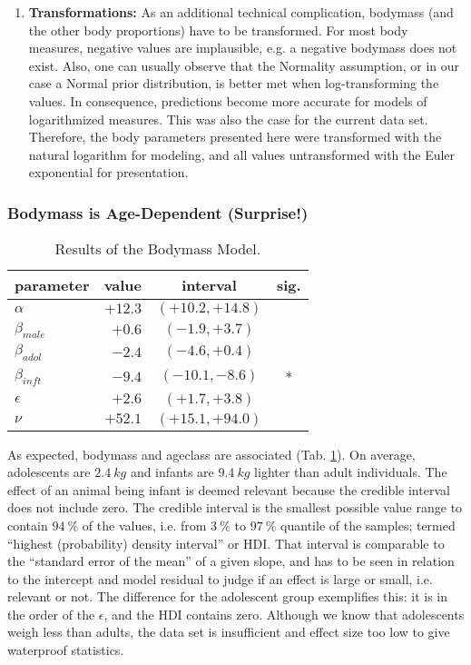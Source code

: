 \begin{enumerate}
\item \textbf{Transformations:}
\label{sec:org1dc49e0}
As an additional technical complication, bodymass (and the other body proportions) have to be transformed.
For most body measures, negative values are implausible, e.g. a negative bodymass does not exist.
Also, one can usually observe that the Normality assumption, or in our case a Normal prior distribution, is better met when log-transforming the values.
In consequence, predictions become more accurate for models of logarithmized measures.
This was also the case for the current data set.
Therefore, the body parameters presented here were transformed with the natural logarithm for modeling, and all values untransformed with the Euler exponential for presentation.
\end{enumerate}


\FloatBarrier
\subsubsection{Bodymass is Age-Dependent (Surprise!)}
\label{bodymass:results}
\begin{table}[p]
\caption{\label{tab:bodyproportions}Results of the Bodymass Model.}
\centering
\begin{tabular}{|l|r|c|c|}
\hline
\textbf{parameter} & \textbf{value} & \textbf{interval} & \textbf{sig.}\\[0pt]
\hline
\(\alpha\) & \(+12.3\) & \(\left(+10.2, +14.8\right)\) & \\[0pt]
\(\beta_{male}\) & \(+0.6\) & \(\left(-1.9, +3.7\right)\) & \\[0pt]
\(\beta_{adol}\) & \(-2.4\) & \(\left(-4.6, +0.4\right)\) & \\[0pt]
\(\beta_{inft}\) & \(-9.4\) & \(\left(-10.1, -8.6\right)\) & *\\[0pt]
\(\epsilon\) & \(+2.6\) & \(\left(+1.7, +3.8\right)\) & \\[0pt]
\(\nu\) & \(+52.1\) & \(\left(+15.1, +94.0\right)\) & \\[0pt]
\hline
\end{tabular}
\end{table}


As expected, bodymass and ageclass are associated (Tab. \ref{tab:bodyproportions}).
On average, adolescents are \(2.4\ kg\) and infants are \(9.4\ kg\) lighter than adult individuals.
The effect of an animal being infant is deemed relevant because the credible interval does not include zero.
The credible interval is the smallest possible value range to contain \(94\ \%\) of the values, i.e. from \(3\ \%\) to \(97\ \%\) quantile of the samples; termed ``highest (probability) density interval'' or HDI.
That interval is comparable to the ``standard error of the mean'' of a given slope, and has to be seen in relation to the intercept and model residual to judge if an effect is large or small, i.e. relevant or not.
The difference for the adolescent group exemplifies this: it is in the order of the \(\epsilon\), and the HDI contains zero.
Although we know that adolescents weigh less than adults, the data set is insufficient and effect size too low to give waterproof statistics.

